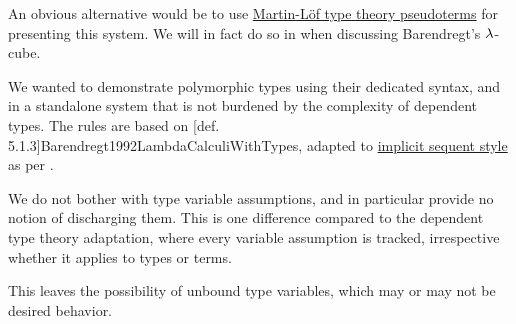 \begin{comments}
  \item An obvious alternative would be to use \hyperref[def:mltt_pseudoterm]{Martin-L\"of type theory pseudoterms} for presenting this system. We will in fact do so in  when discussing Barendregt's \( {\mathrm \lambda} \)-cube.

  We wanted to demonstrate polymorphic types using their dedicated syntax, and in a standalone system that is not burdened by the complexity of dependent types. The rules are based on [def. 5.1.3]{Barendregt1992LambdaCalculiWithTypes}, adapted to \hyperref[rem:natural_deduction_explicit_sequents]{implicit sequent style} as per .

  \item We do not bother with type variable assumptions, and in particular provide no notion of discharging them. This is one difference compared to the dependent type theory adaptation, where every variable assumption is tracked, irrespective whether it applies to types or terms.

  This leaves the possibility of unbound type variables, which may or may not be desired behavior.
\end{comments}


